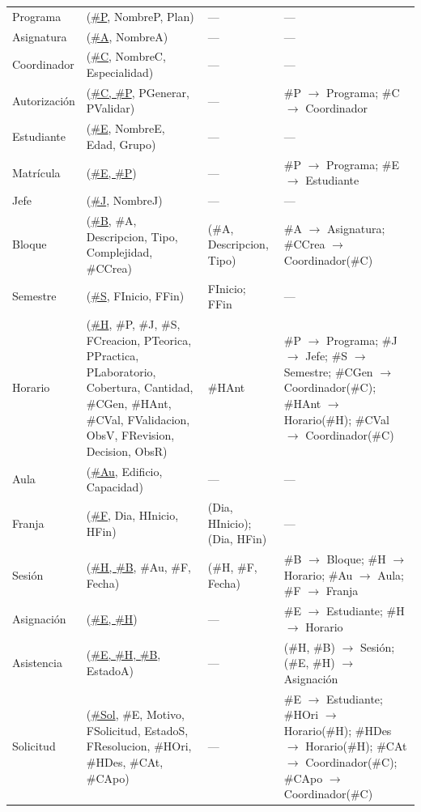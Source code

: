 {\footnotesize\filas
\begin{xltabular}{\linewidth}{L{0.45}L{1.45}L{0.5}L{1.1}}
 &  &  &  \\
\endhead
Programa & (\underline{\#P}, NombreP, Plan) & --- & --- \\
Asignatura & (\underline{\#A}, NombreA) & --- & --- \\
Coordinador & (\underline{\#C}, NombreC, Especialidad) & --- & --- \\
Autorización & (\underline{\#C, \#P}, PGenerar, PValidar) & --- & \#P \ensuremath{\to} Programa; \#C \ensuremath{\to} Coordinador \\
Estudiante & (\underline{\#E}, NombreE, Edad, Grupo) & --- & --- \\
Matrícula & (\underline{\#E, \#P}) & --- & \#P \ensuremath{\to} Programa; \#E \ensuremath{\to} Estudiante \\
Jefe & (\underline{\#J}, NombreJ) & --- & --- \\
Bloque & (\underline{\#B}, \#A, Descripcion, Tipo, Complejidad, \#CCrea) & (\#A, Descripcion, Tipo) & \#A \ensuremath{\to} Asignatura; \#CCrea \ensuremath{\to} Coordinador(\#C) \\
Semestre & (\underline{\#S}, FInicio, FFin) & FInicio; FFin & --- \\
Horario & (\underline{\#H}, \#P, \#J, \#S, FCreacion, PTeorica, PPractica, PLaboratorio, Cobertura, Cantidad, \#CGen, \#HAnt, \#CVal, FValidacion, ObsV, FRevision, Decision, ObsR) & \#HAnt & \#P \ensuremath{\to} Programa; \#J \ensuremath{\to} Jefe; \#S \ensuremath{\to} Semestre; \#CGen \ensuremath{\to} Coordinador(\#C); \#HAnt \ensuremath{\to} Horario(\#H); \#CVal \ensuremath{\to} Coordinador(\#C) \\
Aula & (\underline{\#Au}, Edificio, Capacidad) & --- & --- \\
Franja & (\underline{\#F}, Dia, HInicio, HFin) & (Dia, HInicio); (Dia, HFin) & --- \\
Sesión & (\underline{\#H, \#B}, \#Au, \#F, Fecha) & (\#H, \#F, Fecha) & \#B \ensuremath{\to} Bloque; \#H \ensuremath{\to} Horario; \#Au \ensuremath{\to} Aula; \#F \ensuremath{\to} Franja \\
Asignación & (\underline{\#E, \#H}) & --- & \#E \ensuremath{\to} Estudiante; \#H \ensuremath{\to} Horario \\
Asistencia & (\underline{\#E, \#H, \#B}, EstadoA) & --- & (\#H, \#B) \ensuremath{\to} Sesión; (\#E, \#H) \ensuremath{\to} Asignación \\
Solicitud & (\underline{\#Sol}, \#E, Motivo, FSolicitud, EstadoS, FResolucion, \#HOri, \#HDes, \#CAt, \#CApo) & --- & \#E \ensuremath{\to} Estudiante; \#HOri \ensuremath{\to} Horario(\#H); \#HDes \ensuremath{\to} Horario(\#H); \#CAt \ensuremath{\to} Coordinador(\#C); \#CApo \ensuremath{\to} Coordinador(\#C) \\
\end{xltabular}}

